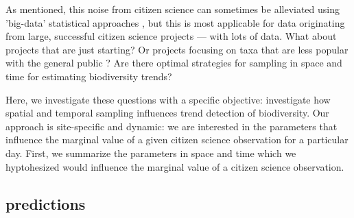 \documentclass[9pt,twocolumn,twoside,lineno]{pnas-new}
\begin{document}
As mentioned, this noise from citizen science \cite{bird2014statistical} can sometimes be alleviated using 'big-data' statistical approaches \cite{kelling2015taking}, but this is most applicable for data originating from large, successful citizen science projects --- with lots of data. What about projects that are just starting? Or projects focusing on taxa that are less popular with the general public \cite{mair2016explaining, ward2014understanding}? Are there optimal strategies for sampling in space and time for estimating biodiversity trends?

Here, we investigate these questions with a specific objective: investigate how spatial and temporal sampling influences trend detection of biodiversity. Our approach is site-specific and dynamic: we are interested in the parameters that influence the marginal value of a given citizen science observation for a particular day. First, we summarize the parameters in space and time which we hyptohesized would influence the marginal value of a citizen science observation.

\subsection*{predictions}
\end{document}
